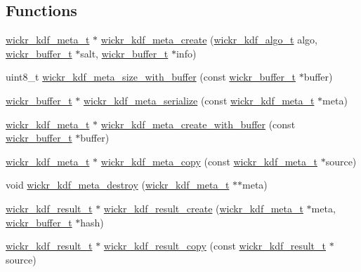 \subsection*{Functions}
\begin{DoxyCompactItemize}
\item 
\hyperlink{structwickr__kdf__meta}{wickr\+\_\+kdf\+\_\+meta\+\_\+t} $\ast$ \hyperlink{group__wickr__kdf_gaeee99bcfbf94fd964158ac402e2deb48}{wickr\+\_\+kdf\+\_\+meta\+\_\+create} (\hyperlink{structwickr__kdf__algo}{wickr\+\_\+kdf\+\_\+algo\+\_\+t} algo, \hyperlink{structwickr__buffer}{wickr\+\_\+buffer\+\_\+t} $\ast$salt, \hyperlink{structwickr__buffer}{wickr\+\_\+buffer\+\_\+t} $\ast$info)
\item 
uint8\+\_\+t \hyperlink{group__wickr__kdf_ga92020ae3e8ffb469c927d17f95a7dff1}{wickr\+\_\+kdf\+\_\+meta\+\_\+size\+\_\+with\+\_\+buffer} (const \hyperlink{structwickr__buffer}{wickr\+\_\+buffer\+\_\+t} $\ast$buffer)
\item 
\hyperlink{structwickr__buffer}{wickr\+\_\+buffer\+\_\+t} $\ast$ \hyperlink{group__wickr__kdf_ga1bc501706b4a8a727dfd34f8a00e56da}{wickr\+\_\+kdf\+\_\+meta\+\_\+serialize} (const \hyperlink{structwickr__kdf__meta}{wickr\+\_\+kdf\+\_\+meta\+\_\+t} $\ast$meta)
\item 
\hyperlink{structwickr__kdf__meta}{wickr\+\_\+kdf\+\_\+meta\+\_\+t} $\ast$ \hyperlink{group__wickr__kdf_gaebd1caf94717c403c4afb5cca8f511b6}{wickr\+\_\+kdf\+\_\+meta\+\_\+create\+\_\+with\+\_\+buffer} (const \hyperlink{structwickr__buffer}{wickr\+\_\+buffer\+\_\+t} $\ast$buffer)
\item 
\hyperlink{structwickr__kdf__meta}{wickr\+\_\+kdf\+\_\+meta\+\_\+t} $\ast$ \hyperlink{group__wickr__kdf_ga6ed878108fd58ee420239689de505190}{wickr\+\_\+kdf\+\_\+meta\+\_\+copy} (const \hyperlink{structwickr__kdf__meta}{wickr\+\_\+kdf\+\_\+meta\+\_\+t} $\ast$source)
\item 
void \hyperlink{group__wickr__kdf_ga2bd458ae83d4d5bb03b9d0835baeefd7}{wickr\+\_\+kdf\+\_\+meta\+\_\+destroy} (\hyperlink{structwickr__kdf__meta}{wickr\+\_\+kdf\+\_\+meta\+\_\+t} $\ast$$\ast$meta)
\item 
\hyperlink{structwickr__kdf__result}{wickr\+\_\+kdf\+\_\+result\+\_\+t} $\ast$ \hyperlink{group__wickr__kdf_ga514c095b3b2f1ead49bd7fbf0b427407}{wickr\+\_\+kdf\+\_\+result\+\_\+create} (\hyperlink{structwickr__kdf__meta}{wickr\+\_\+kdf\+\_\+meta\+\_\+t} $\ast$meta, \hyperlink{structwickr__buffer}{wickr\+\_\+buffer\+\_\+t} $\ast$hash)
\item 
\hyperlink{structwickr__kdf__result}{wickr\+\_\+kdf\+\_\+result\+\_\+t} $\ast$ \hyperlink{group__wickr__kdf_ga69c03c94bf446471ba74f76ee883f8d4}{wickr\+\_\+kdf\+\_\+result\+\_\+copy} (const \hyperlink{structwickr__kdf__result}{wickr\+\_\+kdf\+\_\+result\+\_\+t} $\ast$source)
$$
\end{DoxyCompactItemize}
